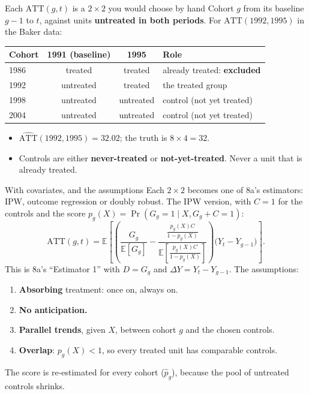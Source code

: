 \documentclass[
  11pt,
  ignorenonframetext,
  aspectratio=169,
]{beamer}
\providecommand{\tightlist}{%
  \setlength{\itemsep}{0pt}\setlength{\parskip}{0pt}}
\begin{document}
\begin{frame}{Each \(\text{ATT}(g,t)\) is a \(2 \times 2\) you would
choose by hand}
\protect{}\label{each-textattgt-is-a-2-times-2-you-would-choose-by-hand}
Cohort \(g\) from its baseline \(g - 1\) to \(t\), against units
\textbf{untreated in both periods}. For \(\text{ATT}(1992, 1995)\) in
the Baker data:

\begin{center}\small
\begin{tabular}{lccl}
\toprule
Cohort & 1991 (baseline) & 1995 & Role \\
\midrule
1986 & treated & treated & already treated: \textbf{excluded} \\
1992 & untreated & treated & the treated group \\
1998 & untreated & untreated & control (not yet treated) \\
2004 & untreated & untreated & control (not yet treated) \\
\bottomrule
\end{tabular}
\end{center}

\begin{itemize}
\tightlist
\item
  \(\widehat{\text{ATT}}(1992, 1995) = 32.02\); the truth is
  \(8 \times 4 = 32\).
\item
  Controls are either \textbf{never-treated} or
  \textbf{not-yet-treated}. Never a unit that is already treated.
\end{itemize}
\end{frame}

\begin{frame}{With covariates, and the assumptions}
\protect{}\label{with-covariates-and-the-assumptions}
Each \(2 \times 2\) becomes one of 8a's estimators: IPW, outcome
regression or doubly robust. The IPW version, with \(C = 1\) for the
controls and the score \(p_g(X) = \Pr(G_g = 1 \mid X, G_g + C = 1)\): \[
\text{ATT}(g,t) = \mathbb{E}\!\left[\left(\frac{G_g}{\mathbb{E}[G_g]} - \frac{\frac{p_g(X) C}{1 - p_g(X)}}{\mathbb{E}\!\left[\frac{p_g(X) C}{1 - p_g(X)}\right]}\right)\big(Y_t - Y_{g-1}\big)\right].
\] This is 8a's ``Estimator 1'' with \(D = G_g\) and
\(\Delta Y = Y_t - Y_{g-1}\). The assumptions:

\begin{enumerate}
\tightlist
\item
  \textbf{Absorbing} treatment: once on, always on.
\item
  \textbf{No anticipation.}
\item
  \textbf{Parallel trends}, given \(X\), between cohort \(g\) and the
  chosen controls.
\item
  \textbf{Overlap}: \(p_g(X) < 1\), so every treated unit has comparable
  controls.
\end{enumerate}

The score is re-estimated for every cohort (\(\hat p_g\)), because the
pool of untreated controls shrinks.
\end{frame}
\end{document}
